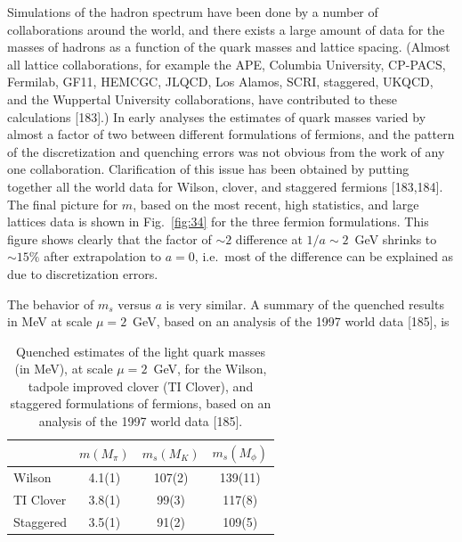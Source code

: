 Simulations of the hadron spectrum have been done by a number of collaborations around the world, and there exists a large amount of data for the masses of hadrons as a function of the quark masses and lattice spacing. (Almost all lattice collaborations, for example the APE, Columbia University, CP-PACS, Fermilab, GF11, HEMCGC, JLQCD, Los Alamos, SCRI, staggered, UKQCD, and the Wuppertal University collaborations, have contributed to these calculations [183].) In early analyses the estimates of quark masses varied by almost a factor of two between different formulations of fermions, and the pattern of the discretization and quenching errors was not obvious from the work of any one collaboration. Clarification of this issue has been obtained by putting together all the world data for Wilson, clover, and staggered fermions [183,184]. The final picture for $m$, based on the most recent, high statistics, and large lattices data is shown in Fig.~\ref{fig:34} for the three fermion formulations. This figure shows clearly that the factor of $\sim 2$ difference at $1/a \sim 2$~GeV shrinks to $\sim 15\%$ after extrapolation to $a = 0$, i.e.\ most of the difference can be explained as due to discretization errors.

The behavior of $m_s$ versus $a$ is very similar. A summary of the quenched results in MeV at scale $\mu = 2$~GeV, based on an analysis of the 1997 world data [185], is

\begin{table}[htbp]
\centering
\begin{tabular}{lccc}
\toprule
          & $m(M_\pi)$ & $m_s(M_K)$ & $m_s(M_\phi)$ \\
\midrule
Wilson    & 4.1(1)     & 107(2)     & 139(11)       \\
TI Clover & 3.8(1)     & 99(3)      & 117(8)        \\
Staggered & 3.5(1)     & 91(2)      & 109(5)        \\
\bottomrule
\end{tabular}
\caption*{Quenched estimates of the light quark masses (in MeV), at scale $\mu = 2$~GeV, for the Wilson, tadpole improved clover (TI Clover), and staggered formulations of fermions, based on an analysis of the 1997 world data [185].}
\label{tab:light-quark-masses}
\end{table}

